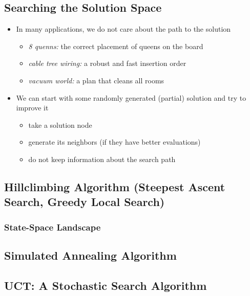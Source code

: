 \documentclass[conference, a4paper]{styles/acmsiggraph}
\begin{document}
    \subsection{Searching the Solution Space}
        \begin{itemize}
            \item In many applications, we do not care about the path to the solution
                \begin{itemize}
                    \item \textit{8 quenns:} the correct placement of queens on the board
                    \item \textit{cable tree wiring:} a robust and fast insertion order
                    \item \textit{vacuum world:} a plan that cleans all rooms
                \end{itemize}
            \item We can start with some randomly generated (partial) solution and try to improve it
                \begin{itemize}
                    \item take a solution node
                    \item generate its neighbors (if they have better evaluations)
                    \item do not keep information about the search path
                \end{itemize}
        \end{itemize}
    
    \subsection{Hillclimbing Algorithm (Steepest Ascent Search, Greedy Local Search)}
        \subsubsection{State-Space Landscape}
    \subsection{Simulated Annealing Algorithm}
    \subsection{UCT: A Stochastic Search Algorithm}
    
    
    
    
    
\end{document}
